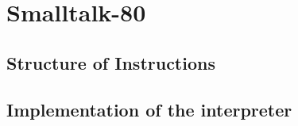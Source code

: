 \chapter{Smalltalk-80}\label{cha:chapter3}

\section{Structure of Instructions}

\section{Implementation of the interpreter}
